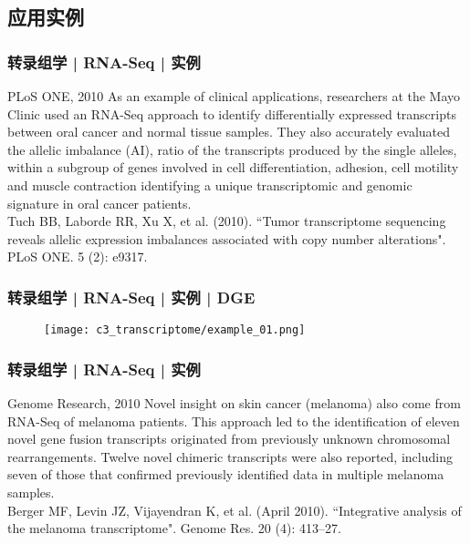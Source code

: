 \subsection{应用实例}
\begin{frame}
  \frametitle{转录组学 | RNA-Seq | 实例}
  \begin{block}{PLoS ONE, 2010}
  As an example of clinical applications, researchers at the Mayo Clinic used an RNA-Seq approach to identify differentially expressed transcripts between oral cancer and normal tissue samples. They also accurately evaluated the allelic imbalance (AI), ratio of the transcripts produced by the single alleles, within a subgroup of genes involved in cell differentiation, adhesion, cell motility and muscle contraction identifying a unique transcriptomic and genomic signature in oral cancer patients.\\
  \vspace{0.5em}
 Tuch BB, Laborde RR, Xu X, et al. (2010). ``Tumor transcriptome sequencing reveals allelic expression imbalances associated with copy number alterations". PLoS ONE. 5 (2): e9317.
  \end{block}
\end{frame}

\begin{frame}
  \frametitle{转录组学 | RNA-Seq | 实例 | DGE}
  \begin{figure}
    \centering
    \texttt{[image: c3\_transcriptome/example\_01.png]}
  \end{figure}
\end{frame}

\begin{frame}
  \frametitle{转录组学 | RNA-Seq | 实例}
  \begin{block}{Genome Research, 2010}
   Novel insight on skin cancer (melanoma) also come from RNA-Seq of melanoma patients. This approach led to the identification of eleven novel gene fusion transcripts originated from previously unknown chromosomal rearrangements. Twelve novel chimeric transcripts were also reported, including seven of those that confirmed previously identified data in multiple melanoma samples.\\
   \vspace{0.5em}
Berger MF, Levin JZ, Vijayendran K, et al. (April 2010). ``Integrative analysis of the melanoma transcriptome". Genome Res. 20 (4): 413–27.
  \end{block}
\end{frame}

